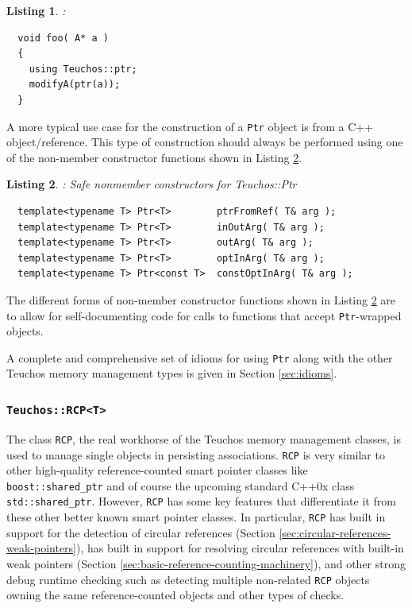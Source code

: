 \documentclass[pdf,ps2pdf,11pt]{SANDreport}
\newtheorem{listing}{Listing}
\begin{document}
\begin{listing}:\\
\label{listing:using-ptr}
{\small\begin{verbatim}
  void foo( A* a )
  {
    using Teuchos::ptr;
    modifyA(ptr(a));
  }
\end{verbatim}}
\end{listing}

A more typical use case for the construction of a {}\texttt{Ptr}
object is from a C++ object/reference.  This type of construction
should always be performed using one of the non-member constructor
functions shown in Listing
{}\ref{listing:ptr-from-ref-nonmember-constructors}.

\begin{listing}: Safe nonmember constructors for Teuchos::Ptr\\
\label{listing:ptr-from-ref-nonmember-constructors}
{\small\begin{verbatim}
  template<typename T> Ptr<T>        ptrFromRef( T& arg );
  template<typename T> Ptr<T>        inOutArg( T& arg );
  template<typename T> Ptr<T>        outArg( T& arg );
  template<typename T> Ptr<T>        optInArg( T& arg );
  template<typename T> Ptr<const T>  constOptInArg( T& arg );
\end{verbatim}}
\end{listing}

The different forms of non-member constructor functions shown in
Listing {}\ref{listing:ptr-from-ref-nonmember-constructors} are to
allow for self-documenting code for calls to functions that accept
{}\texttt{Ptr}-wrapped objects.

A complete and comprehensive set of idioms for using {}\texttt{Ptr}
along with the other Teuchos memory management types is given in
Section {}\ref{sec:idioms}.


%
{}\subsubsection{\texttt{Teuchos::RCP<T>}}
%

The class {}\texttt{RCP}, the real workhorse of the Teuchos memory
management classes, is used to manage single objects in persisting
associations.  {}\texttt{RCP} is very similar to other high-quality
reference-counted smart pointer classes like
{}\texttt{boost::shared\_ptr} and of course the upcoming standard
C++0x class {}\texttt{std::shared\_ptr}.  However, {}\texttt{RCP} has
some key features that differentiate it from these other better known
smart pointer classes.  In particular, {}\texttt{RCP} has built in
support for the detection of circular references (Section
{}\ref{sec:circular-references-weak-pointers}), has built in support
for resolving circular references with built-in weak pointers (Section
{}\ref{sec:basic-reference-counting-machinery}), and other strong
debug runtime checking such as detecting multiple non-related
{}\texttt{RCP} objects owning the same reference-counted objects and
other types of checks.
\end{document}
